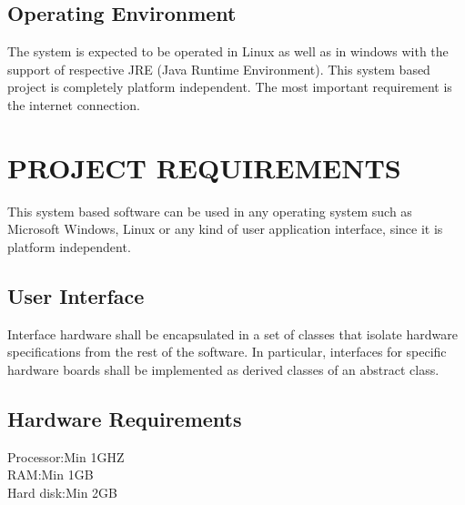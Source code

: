 \documentclass[12pt,a4paper,oneside]{report}
\begin{document}
 
\section{Operating Environment}
The system is expected to be operated in Linux as well as in windows with the support of
respective JRE (Java Runtime Environment). This system based project is completely platform
independent. The most important requirement is the internet connection.

\chapter{PROJECT REQUIREMENTS}
\par
This system based software can be used in any operating system such as Microsoft Windows, Linux or any kind of user application interface, since it is platform independent.
\section{User Interface}
Interface hardware shall be encapsulated in a set of classes that isolate hardware specifications from the rest of the software. In particular, interfaces for specific hardware boards shall be implemented as derived classes of an abstract class.
\
\section{Hardware Requirements}   

  Processor\hspace{.54in}:\hspace{.54in}Min 1GHZ\\

 RAM\hspace{.8in}:\hspace{.54in}Min 1GB\\
 
 Hard disk\hspace{.55in}:\hspace{.54in}Min 2GB\\
 
 
 
\end{document}
